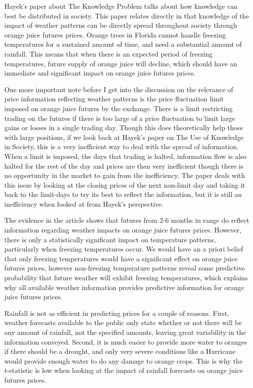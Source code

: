 \documentclass[11pt]{article}
\begin{document}
Hayek's paper about The Knowledge Problem talks about how knowledge can
best be distributed in society. This paper relates directly in that
knowledge of the impact of weather patterns can be directly spread
throughout society through orange juice futures prices. Orange trees in
Florida cannot handle freezing temperatures for a sustained amount of
time, and need a substantial amount of rainfall. This means that when
there is an expected period of freezing temperatures, future supply of
orange juice will decline, which should have an immediate and
significant impact on orange juice futures prices.

One more important note before I get into the discussion on the
relevance of price information reflecting weather patterns is the price
fluctuation limit imposed on orange juice futures by the exchange. There
is a limit restricting trading on the futures if there is too large of a
price fluctuation to limit large gains or losses in a single trading
day. Though this does theoretically help those with large positions, if
we look back at Hayek's paper on The Use of Knowledge in Society, this
is a very inefficient way to deal with the spread of information. When a
limit is imposed, the days that trading is halted, information flow is
also halted for the rest of the day and prices are then very inefficient
though there is no opportunity in the market to gain from the
inefficiency. The paper deals with this issue by looking at the closing
prices of the next non-limit day and taking it back to the limit-days to
try its best to reflect the information, but it is still an inefficiency
when looked at from Hayek's perspective.

The evidence in the article shows that futures from 2-6 months in range
do reflect information regarding weather impacts on orange juice futures
prices. However, there is only a statistically significant impact on
temperature patterns, particularly when freezing temperatures occur. We
would have an a priori belief that only freezing temperatures would have
a significant effect on orange juice futures prices, however
non-freezing temperature patterns reveal some predictive probability
that future weather will exhibit freezing temperatures, which explains
why all available weather information provides predictive information
for orange juice futures prices.

Rainfall is not as efficient in predicting prices for a couple of
reasons. First, weather forecasts available to the public only state
whether or not there will be any amount of rainfall, not the specified
amounts, leaving great variability in the information conveyed. Second,
it is much easier to provide more water to oranges if there should be a
drought, and only very severe conditions like a Hurricane would provide
enough water to do any damage to orange crops. This is why the
t-statistic is low when looking at the impact of rainfall forecasts on
orange juice futures prices.
\end{document}
